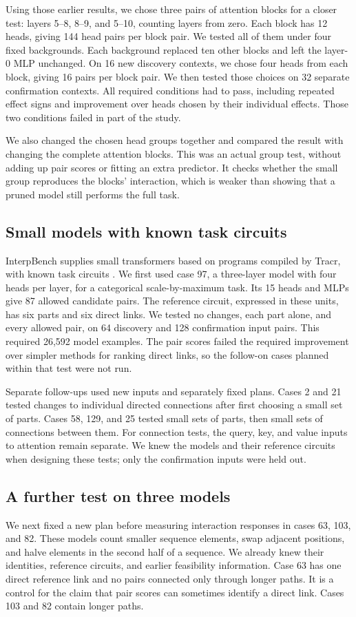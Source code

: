 \documentclass[11pt]{article}
\begin{document}
Using those earlier results, we chose three pairs of attention blocks for a
closer test: layers 5--8, 8--9, and 5--10, counting layers from zero. Each
block has 12 heads, giving 144 head pairs per block pair. We tested all of
them under four fixed backgrounds. Each background replaced ten other blocks
and left the layer-0 MLP unchanged. On 16 new discovery contexts, we chose
four heads from each block, giving 16 pairs per block pair. We then tested
those choices on 32 separate confirmation contexts. All required conditions
had to pass, including repeated effect signs and improvement over heads chosen
by their individual effects. Those two conditions failed in part of the study.

We also changed the chosen head groups together and compared the result with
changing the complete attention blocks. This was an actual group test, without
adding up pair scores or fitting an extra predictor. It checks whether the
small group reproduces the blocks' interaction, which is weaker than showing
that a pruned model still performs the full task.

\subsection{Small models with known task circuits}
InterpBench supplies small transformers based on programs compiled by Tracr,
with known task circuits \citep{gupta2024interpbench,lindner2023tracr}. We first
used case 97, a three-layer model with four heads per layer, for a categorical
scale-by-maximum task. Its 15 heads and MLPs give 87 allowed candidate pairs.
The reference circuit, expressed in these units, has six parts and six direct
links. We tested no changes, each part alone, and every allowed pair, on 64
discovery and 128 confirmation input pairs. This required 26,592 model
examples. The pair scores failed the required improvement over simpler methods
for ranking direct links, so the follow-on cases planned within that test
were not run.

Separate follow-ups used new inputs and separately fixed plans. Cases 2 and 21
tested changes to individual directed connections after first choosing a small
set of parts. Cases 58, 129, and 25 tested small sets of parts, then small sets
of connections between them. For connection tests, the query, key, and value
inputs to attention remain separate. We knew the models and their reference
circuits when designing these tests; only the confirmation inputs were held out.

\subsection{A further test on three models}
We next fixed a new plan before measuring interaction responses in cases 63,
103, and 82. These models count smaller sequence elements, swap adjacent
positions, and halve elements in the second half of a sequence. We already
knew their identities, reference circuits, and earlier feasibility information.
Case 63 has one direct reference link and no pairs connected only through
longer paths. It is a control for the claim that pair scores can sometimes
identify a direct link. Cases 103 and 82 contain longer paths.
\end{document}
